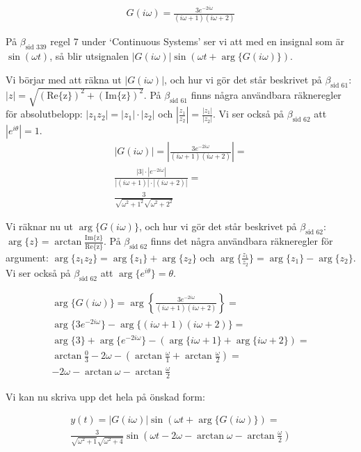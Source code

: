 \documentclass[a4paper]{article}
\newcommand{\mhb}[1]{$\beta_{\text{#1}}$}     %
\begin{document}
\begin{align*}
  G(i\omega) = \frac{3e^{-2i\omega}}{(i\omega + 1)(i\omega + 2)}
\end{align*}


På \mhb{sid 339} regel 7 under `Continuous Systems' ser vi att med en insignal som är $\sin(\omega t)$, så blir utsignalen $|G(i\omega)| \sin(\omega t + \arg\{ G(i\omega) \})$.

Vi börjar med att räkna ut $|G(i\omega)|$, och hur vi gör det står beskrivet på \mhb{sid 61}: $|z| = \sqrt{(\text{Re\{z\}})^2 + (\text{Im\{z\}})^2}$. På \mhb{sid 61} finns några användbara räkneregler för absolutbelopp: $|z_1 z_2| = |z_1|\cdot |z_2|$ och $\left|\frac{z_1}{z_2}\right| = \frac{|z_1|}{|z_2|}$. Vi ser också på \mhb{sid 62} att $|e^{i\theta}| = 1$.
\begin{align*}
  |G(i\omega)| = \left|\frac{3e^{-2i\omega}}{(i\omega + 1)(i\omega + 2)}\right| = \\
  \frac{|3|\cdot|e^{-2i\omega}|}{|(i\omega + 1)|\cdot|(i\omega + 2)|} = \\
  \frac{3}{\sqrt{\omega^2 + 1^2}\sqrt{\omega^2 + 2^2}}
\end{align*}

Vi räknar nu ut $\arg\{ G(i\omega) \}$, och hur vi gör det står beskrivet på \mhb{sid 62}: $\arg\{z\} = \arctan{\frac{\text{Im\{z\}}}{\text{Re\{z\}}}}$. På \mhb{sid 62} finns det några användbara räkneregler för argument: $\arg\{ z_1 z_2 \} = \arg \{z_1\} + \arg \{z_2\}$ och $\arg\{ \frac{z_1}{z_2} \} = \arg\{ z_1 \} - \arg\{ z_2 \}$. Vi ser också på \mhb{sid 62} att $\arg \{e^{i\theta}\} = \theta$.

\begin{align*}
  \arg\{ G(i\omega) \} = \arg \left\{ \frac{3e^{-2i\omega}}{(i\omega + 1)(i\omega + 2)} \right\} = \\
  \arg\{ 3e^{-2i\omega} \} - \arg\{ (i\omega + 1)(i\omega + 2) \} = \\
  \arg\{ 3 \} + \arg\{ e^{-2i\omega} \} - (\arg\{ i\omega + 1\} + \arg\{ i\omega + 2 \}) = \\
  \arctan \frac{0}{3} -2\omega -(\arctan\frac{\omega}{1} + \arctan\frac{\omega}{2}) = \\
  -2\omega -\arctan\omega - \arctan\frac{\omega}{2}
\end{align*}

Vi kan nu skriva upp det hela på önskad form:

\begin{align*}
  y(t) = |G(i\omega)| \sin(\omega t + \arg\{ G(i\omega) \}) = \\
  \frac{3}{\sqrt{\omega^2 + 1}\sqrt{\omega^2 + 4}} \sin(\omega t - 2\omega -\arctan\omega - \arctan\frac{\omega}{2})
\end{align*}
\end{document}
